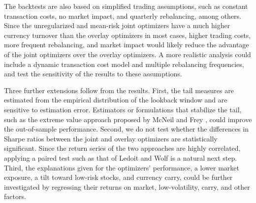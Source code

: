 The backtests are also based on simplified trading assumptions, such as constant transaction costs, no market impact, and quarterly
rebalancing, among others.
Since the unregularized and mean-risk joint optimizers have a much higher currency turnover than the overlay optimizers in most cases, higher trading
costs, more frequent rebalancing, and market impact would likely reduce the advantage of the joint optimizers
over the overlay optimizers. A more realistic analysis could include a dynamic transaction cost model and 
multiple rebalancing frequencies, and test the sensitivity of the results to these assumptions.

Three further extensions follow from the results. First, the tail measures are estimated from the empirical distribution
of the lookback window and are sensitive to estimation error. Estimators or formulations that
stabilize the tail, such as the extreme value approach proposed by McNeil and Frey \cite{McNeilFrey2000}, could improve the out-of-sample performance.
Second, we do not test whether the differences in Sharpe ratios between the joint and overlay optimizers 
are statistically significant. Since the return series of the two approaches are highly correlated, applying a
paired test such as that of Ledoit and Wolf \cite{LedoitWolf2008} is a natural next step.
Third, the explanations given for the optimizers' performance, a lower market
exposure, a tilt toward low-risk stocks, and currency carry, could be further investigated by
regressing their returns on market, low-volatility, carry, and other factors.

